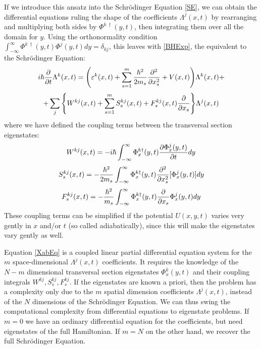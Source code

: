 \documentclass[11pt, a4paper]{article} %
\begin{document}
If we introduce this ansatz into the Schrödinger Equation \eqref{SE}, we can obtain the differential equations ruling the shape of the coefficients $\Lambda^j(x,t)$ by rearranging and multiplying both sides by $\Phi^{k\ \dagger}(y,t)$, then integrating them over all the domain for $y$. Using the orthonormality condition $\int_{-\infty}^{\infty}\Phi^{k\ \dagger}(y,t) \Phi^{j}(y,t) dy= \delta_{kj}$, this leaves with \eqref{BHExp}, the equivalent to the Schrödinger Equation:
\begin{equation}\label{XabEq}
i\hbar \pdv{}{t}\Lambda^k(x,t) = \qty( \varepsilon^k(x,t) + \sum_{s=1}^m\frac{\hbar^2}{2m_s}\pdv[2]{}{x_s}+V(x,t))\Lambda^k(x,t)+
\end{equation}
$$
 +\sum_j \qty{ W^{kj}(x,t) + \sum_{s=1}^m S^{kj}_s(x,t)+F^{kj}_s(x,t)\pdv{}{x_s} } \Lambda^j(x,t) 
$$
where we have defined the coupling terms between the transversal section eigenstates:
\begin{equation}
W^{kj}(x,t) = -i\hbar\int_{-\infty}^{\infty}\Phi_x^{k\dagger}(y,t) \pdv{\Phi^j_x(y,t)}{t} dy
\end{equation}
\begin{equation}\label{S}
S^{kj}_s(x,t) = -\frac{\hbar^2}{2m_s}\int_{-\infty}^{\infty}\Phi_x^{k\dagger}(y,t) \pdv[2]{}{x_s} [\Phi^j_x(y,t)] dy
\end{equation}
\begin{equation}\label{F}
F^{kj}_s(x,t) = -\frac{\hbar^2}{m_s}\int_{-\infty}^{\infty}\Phi_x^{k\dagger}(y,t) \pdv{}{x_s}\Phi^j_x(y,t) dy
\end{equation}
These coupling terms can be simplified if the potential $U(x,y,t)$ varies very gently in $x$ and/or $t$ (so called adiabatically), since this will make the eigenstates vary gently as well.

Equation \eqref{XabEq} is a coupled linear partial differential equation system for the $m$ space-dimensional $\Lambda^j(x,t)$ coefficients. It requires the knowledge of the $N-m$ dimensional transversal section eigenstates $\Phi^k_x(y,t)$ and their coupling integrals $W^{kj}, S^{kj}_s, F^{kj}_s$.  If the eigenstates are known a priori, then the problem has a complexity only due to the $m$ spatial dimension coefficients $\Lambda^j(x,t)$, instead of the $N$ dimensions of the Schrödinger Equation. We can thus swing the computational complexity from differential equations to eigenstate problems. If $m=0$ we have an ordinary differential equation for the coefficients, but need eigenstates of the full Hamiltonian. If $m=N$ on the other hand, we recover the full Schrödinger Equation.
\vspace{-0.3cm}
\end{document}
